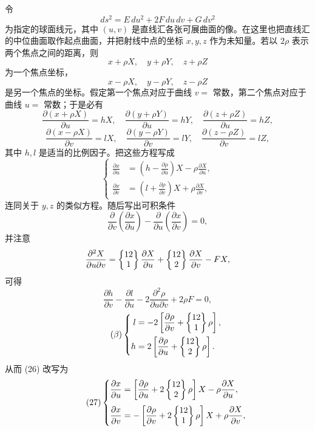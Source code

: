 令
\[
 ds^2=E\,du^2+2F\,du\,dv+G\,dv^2
\]
为指定的球面线元，其中 \((u,v)\) 是直线汇各张可展曲面的像。在这里也把直线汇的中位曲面取作起点曲面，并把射线中点的坐标 \(x,y,z\) 作为未知量。若以 \(2\rho\) 表示两个焦点之间的距离，则
\[
 x+\rho X,\quad y+\rho Y,\quad z+\rho Z
\]
为一个焦点坐标，
\[
 x-\rho X,\quad y-\rho Y,\quad z-\rho Z
\]
是另一个焦点的坐标。假定第一个焦点对应于曲线 \(v=\) 常数，第二个焦点对应于曲线 \(u=\) 常数；于是必有
\[
 \frac{\partial(x+\rho X)}{\partial u}=hX,
 \quad
 \frac{\partial(y+\rho Y)}{\partial u}=hY,
 \quad
 \frac{\partial(z+\rho Z)}{\partial u}=hZ,
\]
\[
 \frac{\partial(x-\rho X)}{\partial v}=lX,
 \quad
 \frac{\partial(y-\rho Y)}{\partial v}=lY,
 \quad
 \frac{\partial(z-\rho Z)}{\partial v}=lZ,
\]
其中 \(h,l\) 是适当的比例因子。把这些方程写成
\begin{equation}\tag{26}
\left\{\begin{aligned}
\frac{\partial x}{\partial u}&=\left(h-\frac{\partial\rho}{\partial u}\right)X-\rho\frac{\partial X}{\partial u},\\[0.25em]
\frac{\partial x}{\partial v}&=\left(l+\frac{\partial\rho}{\partial v}\right)X+\rho\frac{\partial X}{\partial v},
\end{aligned}
\right.
\end{equation}
连同关于 \(y,z\) 的类似方程。随后写出可积条件
\[
 \frac{\partial}{\partial v}\left(\frac{\partial x}{\partial u}\right)-
 \frac{\partial}{\partial u}\left(\frac{\partial x}{\partial v}\right)=0,
\]
并注意
\[
 \frac{\partial^2X}{\partial u\partial v}
 =\left\{\begin{matrix}12\\1\end{matrix}\right\}\frac{\partial X}{\partial u}
 +\left\{\begin{matrix}12\\2\end{matrix}\right\}\frac{\partial X}{\partial v}-FX,
\]
可得
\begin{equation}\tag{$\alpha$}
 \frac{\partial h}{\partial v}-\frac{\partial l}{\partial u}-2\frac{\partial^2\rho}{\partial u\partial v}+2\rho F=0,
\end{equation}
\begin{equation}\tag{$\beta$}
\left\{\begin{aligned}
 l&=-2\left[\frac{\partial\rho}{\partial v}+\left\{\begin{matrix}12\\1\end{matrix}\right\}\rho\right],\\
 h&= 2\left[\frac{\partial\rho}{\partial u}+\left\{\begin{matrix}12\\2\end{matrix}\right\}\rho\right].
\end{aligned}
\right.
\end{equation}
从而 (26) 改写为
\begin{equation}\tag{27}
\left\{\begin{aligned}
\frac{\partial x}{\partial u}&=\left[\frac{\partial\rho}{\partial u}+2\left\{\begin{matrix}12\\2\end{matrix}\right\}\rho\right]X-\rho\frac{\partial X}{\partial u},\\[0.25em]
\frac{\partial x}{\partial v}&=-\left[\frac{\partial\rho}{\partial v}+2\left\{\begin{matrix}12\\1\end{matrix}\right\}\rho\right]X+\rho\frac{\partial X}{\partial v},
\end{aligned}
\right.
\end{equation}
